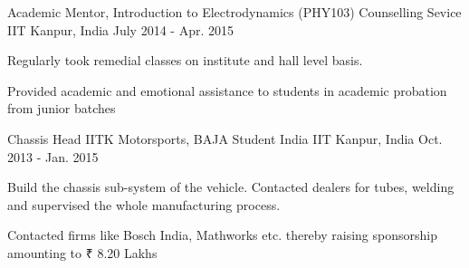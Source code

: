 

\begin{cventries}

  \cventry
    {Academic Mentor, Introduction to Electrodynamics (PHY103)} %
    {Counselling Sevice} %
    {IIT Kanpur, India} %
    {July 2014 - Apr. 2015} %
    {
      \begin{cvitems} %
		\item {Regularly took remedial classes on institute and hall level basis.}
		\item {Provided academic and emotional assistance to students in academic probation from junior batches}
      \end{cvitems}
    }

  \cventry
    {Chassis Head} %
    {IITK Motorsports, BAJA Student India} %
    {IIT Kanpur, India} %
    {Oct. 2013 - Jan. 2015} %
    {
      \begin{cvitems} %
		\item {Build the chassis sub-system of the vehicle. Contacted dealers for tubes, welding and supervised the whole manufacturing process.}
		\item {Contacted firms like Bosch India, Mathworks etc. thereby raising sponsorship amounting to ₹ 8.20 Lakhs}
      \end{cvitems}
    }

\end{cventries}
